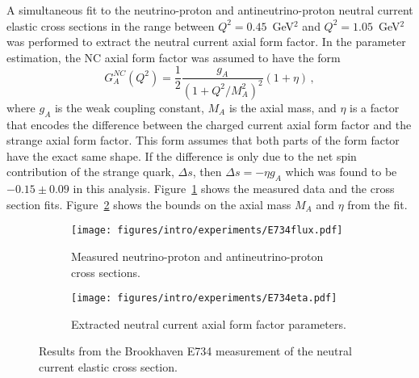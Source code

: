  A simultaneous fit to the neutrino-proton and antineutrino-proton neutral
  current elastic cross sections in the range between $Q^2 = 0.45$~GeV$^2$ and
  $Q^2 = 1.05$~GeV$^2$ was performed to extract the neutral current axial form
  factor.  In the parameter estimation, the NC axial form factor was assumed to
  have the form
  \begin{equation}\label{eq:axdipole}
    G_A^{NC}(Q^2) = \frac{1}{2}\frac{g_A}{(1+Q^2/M_A^2)^2}(1+\eta) \,,
  \end{equation}
  where $g_A$ is the weak coupling constant, $M_A$ is the axial mass, and
  $\eta$ is a factor that encodes the difference between the charged current
  axial form factor and the strange axial form factor. This form assumes that
  both parts of the form factor have the exact same shape. If the difference is
  only due to the net spin contribution of the strange quark, $\Delta s$, then
  $\Delta s = -\eta g_A$ which was found to be $-0.15 \pm 0.09$ in this
  analysis. Figure~\ref{fig:e734xsec} shows the measured data and the cross
  section fits. Figure~\ref{fig:e734eta} shows the bounds on the axial mass
  $M_A$ and $\eta$ from the fit. 
  \begin{figure}[h]
    \centering
    \begin{subfigure}[t]{2.5in}
      \texttt{[image: figures/intro/experiments/E734flux.pdf]}
      \caption{Measured neutrino-proton and antineutrino-proton cross sections.}
      \label{fig:e734xsec}
    \end{subfigure}
    \hspace{2pt}
    \begin{subfigure}[t]{2.5in}
      \texttt{[image: figures/intro/experiments/E734eta.pdf]}
      \caption{Extracted neutral current axial form factor parameters.}
      \label{fig:e734eta}
    \end{subfigure}
    \caption{Results from the Brookhaven E734 measurement of the neutral
    current elastic cross section.}
    \label{fig:e734results}
  \end{figure}

